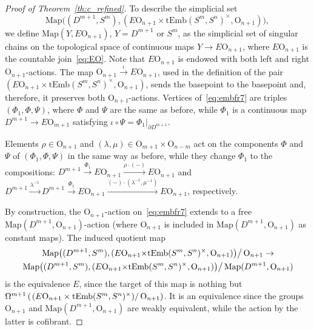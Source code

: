 \documentclass[11pt]{amsart}
\theoremstyle{definition}
\newcommand{\tEmb}{\mathrm{tEmb}}
\newcommand{\Map}{\mathrm{Map}}
\newcommand{\OO}{\mathrm{O}}
\numberwithin{equation}{section}
\begin{document}
\begin{proof}[Proof of Theorem~\ref{th:c_refined}]
To describe the simplicial set 
\begin{equation}\label{eq:embfr7}
\Map\bigl( (D^{m+1},S^m),(E\OO_{n+1}{\times}\tEmb(S^m,S^n)^\times,\OO_{n+1})\bigr),
\end{equation}
 we define $\Map(Y,E\OO_{n+1})$, $Y=D^{m+1}$ or $S^m$, as the simplicial set 
of singular chains on the topological space of continuous maps $Y\to E\OO_{n+1}$, where $E\OO_{n+1}$ is the countable join~\eqref{eq:EO}. Note that $E\OO_{n+1}$ is endowed with both left and right $\OO_{n+1}$-actions.
The map $\OO_{n+1}\xrightarrow{\iota}E\OO_{n+1}$, used in the definition of the pair $(E\OO_{n+1}{\times}\tEmb(S^m,S^n)^\times,\OO_{n+1})$, sends the basepoint to the basepoint and, therefore, it preserves both 
$\OO_{n+1}$-actions. Vertices of~\eqref{eq:embfr7} are triples $(\Phi_1,\Phi,\Psi)$, where $\Phi$ and $\Psi$ are the same as before, while $\Phi_1$ is a continuous map $D^{m+1}\to E\OO_{m+1}$
satisfying $\iota\circ\Psi=\Phi_1|_{\partial D^{m+1}}$.

Elements $\rho\in \OO_{n+1}$ and $(\lambda,\mu)\in\OO_{m+1}\times\OO_{n-m}$ act on the components $\Phi$ and $\Psi$ of $(\Phi_1,\Phi,\Psi)$ in the same way as before, while they change $\Phi_1$ to the compositions:
$D^{m+1}\xrightarrow{\Phi_1} E\OO_{n+1}\xrightarrow{\rho\cdot(-)}E\OO_{n+1}$ and $D^{m+1}\xrightarrow{\lambda^{-1}}D^{m+1}\xrightarrow{\Phi_1} E\OO_{n+1}\xrightarrow{(-)\cdot (\lambda^{-1},\mu^{-1})}E\OO_{n+1}$, respectively.

By construction, the $\OO_{n+1}$-action on~\eqref{eq:embfr7} extends to a free  $\Map(D^{m+1},\OO_{n+1})$-action (where $\OO_{n+1}$ is included in $\Map(D^{m+1},\OO_{n+1})$ as constant maps).
The induced quotient map
\begin{multline*}
\left. \Map\bigl( (D^{m+1},S^m),(E\OO_{n+1}{\times}\tEmb(S^m,S^n)^\times,\OO_{n+1})\bigr)\right/\OO_{n+1}\to\\
\left. \Map\bigl( (D^{m+1},S^m),(E\OO_{n+1}{\times}\tEmb(S^m,S^n)^\times,\OO_{n+1})\bigr)\right/\Map(D^{m+1},\OO_{n+1})
\end{multline*}
is the equivalence $E$, since the target of this map is nothing but $\Omega^{m+1} \left(   \left.\left(E\OO_{n+1}\times \tEmb(S^m,S^n)^\times\right)\right/\OO_{n+1}\right)$. It is an equivalence since the groups $\OO_{n+1}$ and
$\Map(D^{m+1},\OO_{n+1})$ are weakly equivalent, while the action by the latter is cofibrant.
\end{proof}
\end{document}
